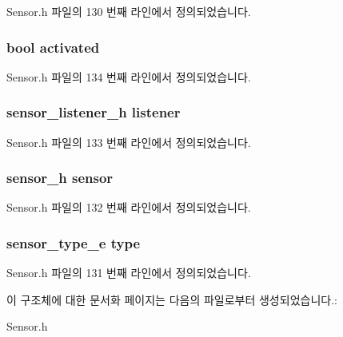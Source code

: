 Sensor.\-h 파일의 130 번째 라인에서 정의되었습니다.

\hypertarget{struct__AccelerometerExtend_a73e9fa0c3543560192f38a8ab6a78c47}{
\subsubsection[{activated}]{\setlength{\rightskip}{0pt plus 5cm}bool activated}}\label{struct__AccelerometerExtend_a73e9fa0c3543560192f38a8ab6a78c47}


Sensor.\-h 파일의 134 번째 라인에서 정의되었습니다.

\hypertarget{struct__AccelerometerExtend_aa977dfb866b24fd7d9a20a9a01b2fd1f}{
\subsubsection[{listener}]{\setlength{\rightskip}{0pt plus 5cm}sensor\-\_\-listener\-\_\-h listener}}\label{struct__AccelerometerExtend_aa977dfb866b24fd7d9a20a9a01b2fd1f}


Sensor.\-h 파일의 133 번째 라인에서 정의되었습니다.

\hypertarget{struct__AccelerometerExtend_a5bae9b7801bc3808411925cde81d3f26}{
\subsubsection[{sensor}]{\setlength{\rightskip}{0pt plus 5cm}sensor\-\_\-h sensor}}\label{struct__AccelerometerExtend_a5bae9b7801bc3808411925cde81d3f26}


Sensor.\-h 파일의 132 번째 라인에서 정의되었습니다.

\hypertarget{struct__AccelerometerExtend_abffb09766da2fc510a79bb51f82a36e1}{
\subsubsection[{type}]{\setlength{\rightskip}{0pt plus 5cm}sensor\-\_\-type\-\_\-e type}}\label{struct__AccelerometerExtend_abffb09766da2fc510a79bb51f82a36e1}


Sensor.\-h 파일의 131 번째 라인에서 정의되었습니다.



이 구조체에 대한 문서화 페이지는 다음의 파일로부터 생성되었습니다.\-:\begin{DoxyCompactItemize}
\item 
Sensor.\-h\end{DoxyCompactItemize}
